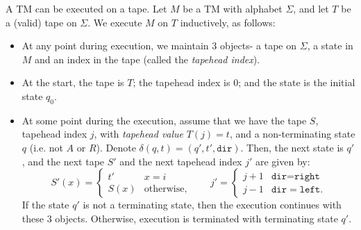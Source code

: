 A TM can be executed on a tape. Let $M$ be a TM with alphabet $\Sigma$, and let $T$ be a (valid) tape on $\Sigma$. We execute $M$ on $T$ inductively, as follows:
\begin{itemize}
    \item At any point during execution, we maintain 3 objects- a tape on $\Sigma$, a state in $M$ and an index in the tape (called the \emph{tapehead index}). 
    \item At the start, the tape is $T$; the tapehead index is $0$; and the state is the initial state $q_0$. 
    \item At some point during the execution, assume that we have the tape $S$, tapehead index $j$, with \emph{tapehead value} $T(j) = t$, and a non-terminating state $q$ (i.e. not $A$ or $R$). Denote $\delta(q, t) = (q', t', \texttt{dir})$. Then, the next state is $q'$, and the next tape $S'$ and the next tapehead index $j'$ are given by:
    \[S'(x) = \begin{cases}
        t' & x = i \\
        S(x) & \text{otherwise},
    \end{cases} \qquad j' = \begin{cases}
        j+1 & \texttt{dir} = \texttt{right} \\
        j-1 & \texttt{dir} = \texttt{left}.
    \end{cases}\]
    If the state $q'$ is not a terminating state, then the execution continues with these 3 objects. Otherwise, execution is terminated with terminating state $q'$.
\end{itemize}

